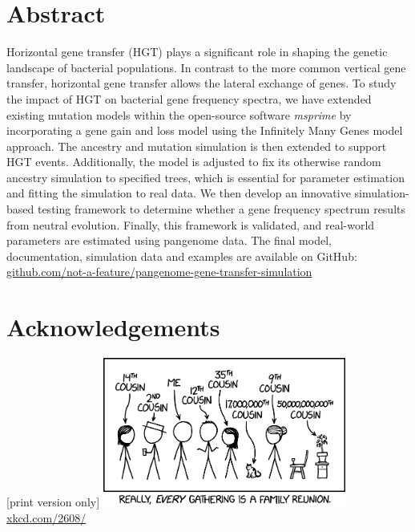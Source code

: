 \documentclass[twoside,12pt,a4paper]{report}
\begin{document}

\setcounter{page}{1}


\section*{Abstract}
Horizontal gene transfer (HGT) plays a significant role in shaping the genetic landscape of bacterial populations.
In contrast to the more common vertical gene transfer, horizontal gene transfer allows the lateral exchange of genes.
To study the impact of HGT on bacterial gene frequency spectra, we have extended existing mutation models within the
open-source software \textit{msprime} by incorporating a gene gain and loss model using the Infinitely Many Genes model approach.
The ancestry and mutation simulation is then extended to support HGT events.
Additionally, the model is adjusted to fix its otherwise random ancestry simulation to specified trees, which is essential for
parameter estimation and fitting the simulation to real data.
We then develop an innovative simulation-based testing framework to determine whether a gene frequency spectrum results from neutral evolution.
Finally, this framework is validated, and real-world parameters are estimated using pangenome data.
The final model, documentation, simulation data and examples are available on GitHub: \href{https://github.com/not-a-feature/pangenome-gene-transfer-simulation/}{github.com/not-a-feature/pangenome-gene-transfer-simulation}

\newpage

\section*{Acknowledgements}
 [print version only]
\vfill
\includegraphics[width=8cm]{figures/xkcd.png}\\
\href{https://xkcd.com/2608/}{xkcd.com/2608/}
\end{document}
